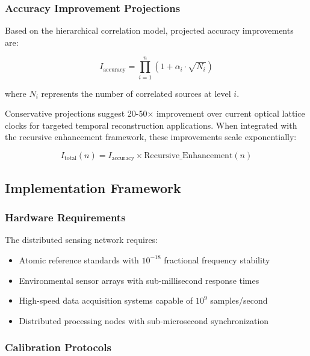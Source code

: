 \documentclass[12pt,a4paper]{article}
\begin{document}
{\subsubsection{Accuracy Improvement Projections}

Based on the hierarchical correlation model, projected accuracy improvements are:

\begin{equation}
I_{\text{accuracy}} = \prod_{i=1}^{n} (1 + \alpha_i \cdot \sqrt{N_i})
\end{equation}

where $N_i$ represents the number of correlated sources at level $i$.

Conservative projections suggest 20-50× improvement over current optical lattice clocks for targeted temporal reconstruction applications. When integrated with the recursive enhancement framework, these improvements scale exponentially:

\begin{equation}
I_{\text{total}}(n) = I_{\text{accuracy}} \times \text{Recursive\_Enhancement}(n)
\end{equation}

\subsection{Implementation Framework}

\subsubsection{Hardware Requirements}

The distributed sensing network requires:

\begin{itemize}
\item Atomic reference standards with $10^{-18}$ fractional frequency stability
\item Environmental sensor arrays with sub-millisecond response times
\item High-speed data acquisition systems capable of $10^9$ samples/second
\item Distributed processing nodes with sub-microsecond synchronization
\end{itemize}

\subsubsection{Calibration Protocols}

}
\end{document}
